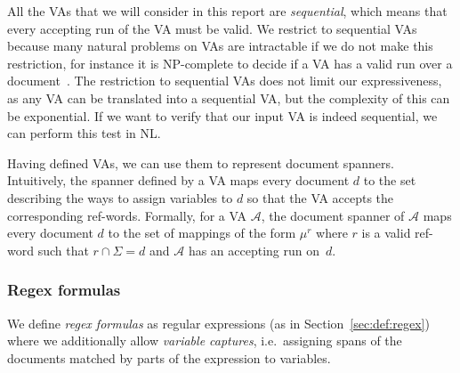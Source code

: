 \documentclass[11px]{article}
\theoremstyle{definition}
\begin{document}

        All the VAs that we will consider in this report are
        \textit{sequential}, which means that every accepting run of the VA
        must be valid. We restrict to sequential VAs because many natural
        problems on VAs are intractable if we do not make this restriction, for
        instance it is NP-complete to decide if a VA has a valid run over a
        document~\cite{freydenberger:LIPIcs:2017}. The restriction to
        sequential VAs does not limit our expressiveness, as any VA can be
        translated into a sequential VA, but the complexity of this can be
        exponential\cite{maturana2018document}. If we want to verify that our
        input VA is indeed sequential, we can perform this test in
        NL\cite{maturana2018document}.

        Having defined VAs, we can use them to represent document spanners.
        Intuitively, the spanner defined by a VA maps every document $d$ to the
        set describing the ways to assign variables to $d$ so that the VA
        accepts the corresponding ref-words. Formally, for a VA $\mathcal{A}$,
        the document spanner of $\mathcal{A}$ maps every document $d$ to the
        set of mappings of the form $\mu^r$ where $r$ is a valid ref-word such
        that $r \cap \Sigma = d$ and $\mathcal{A}$ has an accepting run on~$d$.


      \subsubsection{Regex formulas}%
        \label{sec:regex_formula}

        We define \emph{regex formulas} as regular expressions (as in
        Section~\ref{sec:def:regex}) where we additionally allow \emph{variable
        captures}, i.e.\ assigning spans of the documents matched by parts of
        the expression to variables.
\end{document}
